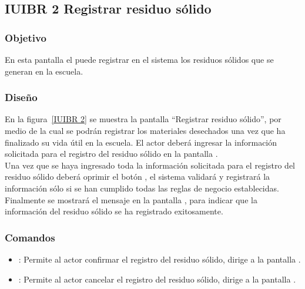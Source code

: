 \subsection{IUIBR 2 Registrar residuo sólido}

\subsubsection{Objetivo}

      En esta pantalla el  puede registrar en el sistema los residuos sólidos que se generan en la escuela.

\subsubsection{Diseño}

    En la figura~\ref{IUIBR 2} se muestra la pantalla ``Registrar residuo sólido'', por medio de la cual se podrán registrar los materiales desechados una vez que ha finalizado su vida útil en la escuela. El actor deberá ingresar la información solicitada para el registro del residuo sólido en la pantalla .\\
        
    Una vez que se haya ingresado toda la información solicitada para el registro del residuo sólido deberá oprimir el botón , el sistema validará y registrará la información sólo si se han cumplido todas las reglas de negocio establecidas.\\
    
    Finalmente se mostrará el mensaje  en la pantalla , para indicar que la información del residuo sólido se ha registrado exitosamente.
      
    



\subsubsection{Comandos}
    \begin{itemize}
	\item {}: Permite al actor confirmar el registro del residuo sólido, dirige a la pantalla .
	\item {}: Permite al actor cancelar el registro del residuo sólido, dirige a la pantalla .
    \end{itemize}

